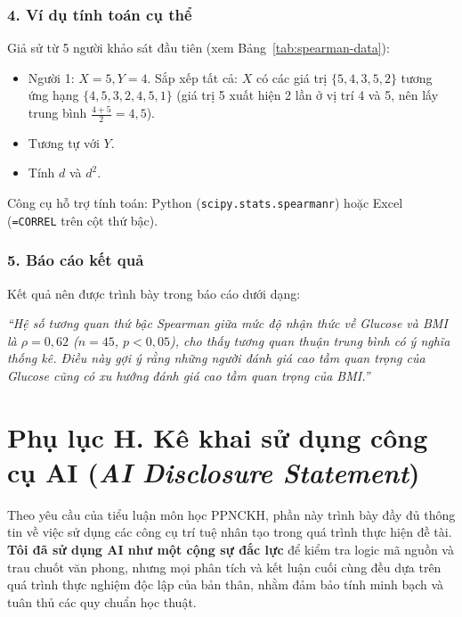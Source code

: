 \documentclass[14pt,a4paper]{extreport}
\begin{document}
\subsubsection*{4. Ví dụ tính toán cụ thể}

Giả sử từ 5 người khảo sát đầu tiên (xem Bảng~\ref{tab:spearman-data}):
\begin{itemize}
  \item Người 1: $X=5, Y=4$. Sắp xếp tất cả: $X$ có các giá trị $\{5, 4, 3, 5, 2\}$ tương ứng hạng $\{4{,}5, 3, 2, 4{,}5, 1\}$ (giá trị 5 xuất hiện 2 lần ở vị trí 4 và 5, nên lấy trung bình $\frac{4+5}{2} = 4{,}5$).
  \item Tương tự với $Y$.
  \item Tính $d$ và $d^2$.
\end{itemize}

Công cụ hỗ trợ tính toán: Python (\texttt{scipy.stats.spearmanr}) hoặc Excel (\texttt{=CORREL} trên cột thứ bậc).

\subsubsection*{5. Báo cáo kết quả}

Kết quả nên được trình bày trong báo cáo dưới dạng:

\textit{``Hệ số tương quan thứ bậc Spearman giữa mức độ nhận thức về Glucose và BMI là $\rho = 0{,}62$ ($n=45$, $p < 0{,}05$), cho thấy tương quan thuận trung bình có ý nghĩa thống kê. Điều này gợi ý rằng những người đánh giá cao tầm quan trọng của Glucose cũng có xu hướng đánh giá cao tầm quan trọng của BMI.''}

\label{app:ai-disclosure}
\section*{Phụ lục H. Kê khai sử dụng công cụ AI (\textit{AI Disclosure Statement})}

Theo yêu cầu của tiểu luận môn học PPNCKH, phần này trình bày đầy đủ thông tin về việc sử dụng các công cụ trí tuệ nhân tạo trong quá trình thực hiện đề tài. \textbf{Tôi đã sử dụng AI như một cộng sự đắc lực} để kiểm tra logic mã nguồn và trau chuốt văn phong, nhưng mọi phân tích và kết luận cuối cùng đều dựa trên quá trình thực nghiệm độc lập của bản thân, nhằm đảm bảo tính minh bạch và tuân thủ các quy chuẩn học thuật.
\end{document}
